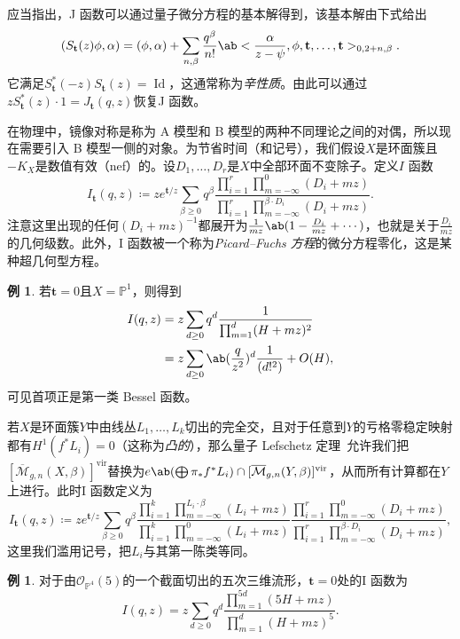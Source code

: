 \documentclass{amsart}
\theoremstyle{definition}
\newtheorem{exm}[thm]{例}
\theoremstyle{remark}
\theoremstyle{plain}
\theoremstyle{definition}
\theoremstyle{remark}
\renewcommand{\P}{\mathbb{P}}
\newcommand{\Mbar}{\overline{\mathcal{M}}}
\newcommand{\mc}[1]{\mathcal{#1}}
\newcommand{\mbf}[1]{\mathbf{#1}}
\newcommand{\mr}[1]{\mathrm{#1}}
\newcommand{\on}[1]{\operatorname{#1}}
\newcommand{\1}{\mathbf{1}}
\newcommand{\2}{\mathbf{2}}
\newcommand{\3}{\mathbf{3}}
\newcommand{\vir}{\mr{vir}}
\begin{document}
应当指出，J 函数可以通过量子微分方程的基本解得到，该基本解由下式给出
\[ ( S_{\mbf{t}}(z) \phi , \alpha) = (\phi, \alpha) + \sum_{n, \beta} \frac{q^{\beta}}{n!} \ab<\frac{\alpha}{z-\psi}, \phi, \mbf{t}, \ldots, \mbf{t}>_{0, 2+n, \beta}. \]
它满足\(S_{\mbf{t}}^*(-z) S_{\mbf{t}}(z) = \on{Id}\)，这通常称为\textit{辛性质}。由此可以通过\(z S_{\mbf{t}}^*(z)\cdot 1 = J_{\mbf{t}}(q, z)\)恢复J 函数。

在物理中，镜像对称是称为 A 模型和 B 模型的两种不同理论之间的对偶，所以现在需要引入 B 模型一侧的对象。为节省时间（和记号），我们假设\(X\)是环面簇且\(-K_X\)是数值有效（nef）的。设\(D_1, \ldots, D_r\)是\(X\)中全部环面不变除子。定义\(I\) 函数
\[
    I_{\mbf{t}}(q, z) \coloneqq z e^{\mbf{t}/z} \sum_{\beta \geq 0} q^{\beta} \frac{\prod_{i=1}^r \prod_{m = -\infty}^{0} (D_i + mz)}{\prod_{i=1}^r \prod_{m=-\infty}^{\beta \cdot D_i} (D_i + mz)}.
\]
注意这里出现的任何\((D_i + mz)^{-1}\)都展开为\(\frac{1}{mz} \ab(1 - \frac{D_i}{mz} + \cdots)\)，也就是关于\(\frac{D_i}{mz}\)的几何级数。此外，I 函数被一个称为\textit{Picard--Fuchs 方程}的微分方程零化，这是某种超几何型方程。

\begin{exm}
    若\(\mbf{t} = 0\)且\(X = \P^1\)，则得到
    \begin{align*}
        I(q,z) &= z\sum_{d \geq 0} q^d \frac{1}{\prod_{m=1}^d (H + mz)^2} \\
        &= z\sum_{d \geq 0} \ab(\frac{q}{z^2})^d \frac{1}{(d!^2)} + O(H),
    \end{align*}
    可见首项正是第一类 Bessel 函数。
\end{exm}

若\(X\)是环面簇\(Y\)中由线丛\(L_1, \ldots, L_k\)切出的完全交，且对于任意到\(Y\)的亏格零稳定映射都有\(H^1(f^* L_i) = 0\)（这称为\textit{凸的}），那么量子 Lefschetz 定理~\cite{CoatesGivental2007}允许我们把\([\Mbar_{g,n}(X, \beta)]^{\vir}\)替换为\(e\ab(\bigoplus \pi_* f^* L_i) \cap [\Mbar_{g,n}(Y, \beta)]^{\vir}\)，从而所有计算都在\(Y\)上进行。此时I 函数定义为
\[
    I_{\mbf{t}}(q,z) \coloneqq z e^{\mbf{t}/z} \sum_{\beta \geq 0} q^{\beta} \frac{\prod_{i=1}^k \prod_{m=-\infty}^{L_i \cdot \beta} (L_i + mz)}{\prod_{i=1}^k \prod_{m=-\infty}^{0} (L_i + mz)} \frac{\prod_{i=1}^r \prod_{m = -\infty}^{0} (D_i + mz)}{\prod_{i=1}^r \prod_{m=-\infty}^{\beta \cdot D_i} (D_i + mz)},
\]
这里我们滥用记号，把\(L_i\)与其第一陈类等同。

\begin{exm}
    对于由\(\mc{O}_{\P^4}(5)\)的一个截面切出的五次三维流形，\(\mbf{t} = 0\)处的I 函数为
    \[ I(q,z) = z \sum_{d \geq 0} q^d \frac{\prod_{m=1}^{5d}(5H+mz)}{\prod_{m=1}^d (H+mz)^5}. \]
\end{exm}
\end{document}
